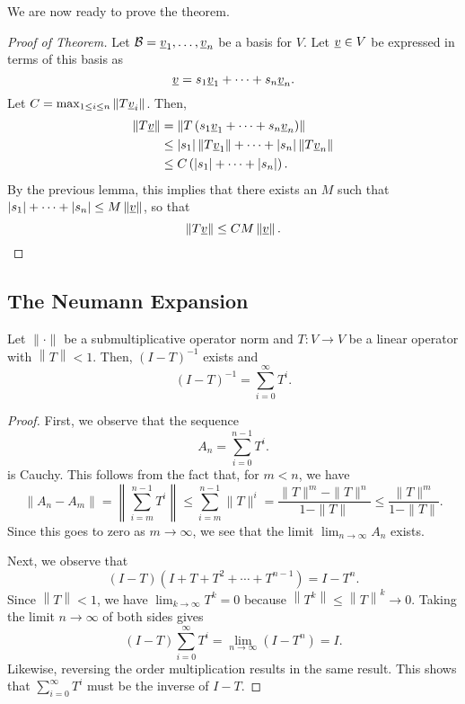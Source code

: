 We are now ready to prove the theorem.
\begin{proof}[Proof of Theorem]
Let $\mathcal{B} = \underline{v}_1, \ldots, \underline{v}_n$ be a basis for $V$.
Let $\underline{v} \in V$ be expressed in terms of this basis as
\begin{equation*}
\underline{v} = s_1 \underline{v}_1 + \cdots + s_n \underline{v}_n .
\end{equation*}
Let $C = \max_{1 \leq i \leq n} \left\| T \underline{v}_i \right\|$.
Then,
\begin{equation*}
\begin{split}
\left\| T \underline{v} \right\| &= \left\| T \left( s_1 \underline{v}_1 + \cdots + s_n \underline{v}_n \right) \right\| \\
& \leq |s_1| \left\| T \underline{v}_1 \right\| + \cdots + |s_n| \left\| T \underline{v}_n \right\| \\
&\leq C \left( |s_1| + \cdots + |s_n| \right) .
\end{split}
\end{equation*}
By the previous lemma, this implies that there exists an $M$ such that $|s_1| + \cdots + |s_n| \leq M \left\| \underline{v} \right\|$, so that
\begin{equation*}
\left\| T \underline{v} \right\| \leq C M \left\| \underline{v} \right\| .
\end{equation*}
\end{proof}



\subsection{The Neumann Expansion}

\begin{theorem}
Let $\| \cdot \|$ be a submultiplicative operator norm and $T \colon V \rightarrow V$ be a linear operator with $\left\| T \right\| < 1$.
Then, $(I-T)^{-1}$ exists and
\[ (I-T)^{-1} = \sum_{i=0}^{\infty} T^i. \]
\end{theorem}
\begin{proof}
First, we observe that the sequence
\[ A_n = \sum_{i=0}^{n-1} T^i.\]
is Cauchy.  This follows from the fact that, for $m<n$, we have
\[ \| A_n - A_m \| = \left\| \sum_{i=m}^{n-1} T^i \right\| \leq \sum_{i=m}^{n-1} \| T \|^i = \frac{\| T \|^m - \| T \|^n}{1 - \| T \|} \leq  \frac{\| T \|^m}{1 - \| T \|}. \]
Since this goes to zero as $m\rightarrow \infty$, we see that the limit $\lim_{n\rightarrow \infty} A_n$ exists.

Next, we observe that
\[ (I - T) \left( I + T + T^2 + \cdots + T^{n-1} \right) = I - T^n . \]
Since $\left\| T \right\| < 1$, we have $\lim_{k \rightarrow \infty} T^k = 0$ because $\left\| T^k \right\| \leq \left\| T \right\|^k \rightarrow 0$.
Taking the limit $n\rightarrow \infty$ of both sides gives
\[ (I - T) \sum_{i=0}^{\infty} T^i =  \lim_{n \rightarrow \infty} (I - T^n ) = I. \]
Likewise, reversing the order multiplication results in the same result.
This shows that $\sum_{i=0}^{\infty} T^i$ must be the inverse of $I -T$.
\end{proof}

